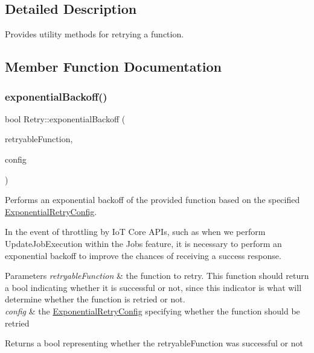\subsection{Detailed Description}
Provides utility methods for retrying a function. 

\subsection{Member Function Documentation}
\mbox{\label{class_aws_1_1_iot_1_1_device_client_1_1_util_1_1_retry_a6d55342ef0ae5d2a10e40b317e9c51cc}} 
\subsubsection{\texorpdfstring{exponential\+Backoff()}{exponentialBackoff()}}
{\footnotesize\ttfamily bool Retry\+::exponential\+Backoff (\begin{DoxyParamCaption}\item[{std\+::function$<$ bool()$>$}]{retryable\+Function,  }\item[{\hyperlink{struct_aws_1_1_iot_1_1_device_client_1_1_util_1_1_retry_1_1_exponential_retry_config}{Exponential\+Retry\+Config}}]{config }\end{DoxyParamCaption})\hspace{0.3cm}{\ttfamily [static]}}



Performs an exponential backoff of the provided function based on the specified \hyperlink{struct_aws_1_1_iot_1_1_device_client_1_1_util_1_1_retry_1_1_exponential_retry_config}{Exponential\+Retry\+Config}. 

In the event of throttling by IoT Core A\+P\+Is, such as when we perform Update\+Job\+Execution within the Jobs feature, it is necessary to perform an exponential backoff to improve the chances of receiving a success response. 
\begin{DoxyParams}{Parameters}
{\em retryable\+Function} & the function to retry. This function should return a bool indicating whether it is successful or not, since this indicator is what will determine whether the function is retried or not. \\
\hline
{\em config} & the \hyperlink{struct_aws_1_1_iot_1_1_device_client_1_1_util_1_1_retry_1_1_exponential_retry_config}{Exponential\+Retry\+Config} specifying whether the function should be retried \\
\hline
\end{DoxyParams}
\begin{DoxyReturn}{Returns}
a bool representing whether the retryable\+Function was successful or not 
\end{DoxyReturn}


